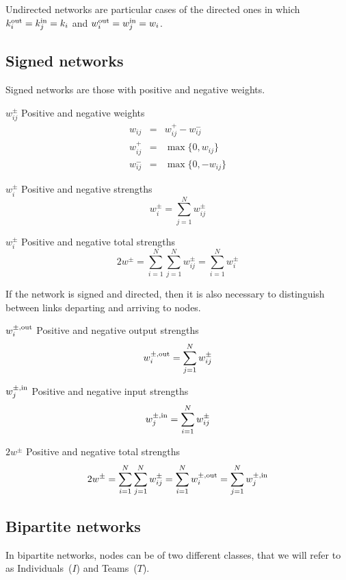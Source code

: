 \documentclass[11pt]{article}
\newcommand{\beq}{\begin{equation}}
\newcommand{\eeq}{\end{equation}}
\newcommand{\bea}{\begin{eqnarray}}
\newcommand{\eea}{\end{eqnarray}}
\newcommand{\sz}{\scriptsize}
\newcommand{\wout}[2]{{#1}_{#2}^{\mbox{\sz out}}}
\newcommand{\win}[2]{{#1}_{#2}^{\mbox{\sz in}}}
\newcommand{\wpos}[2]{{#1}_{#2}^{+}}
\newcommand{\wneg}[2]{{#1}_{#2}^{-}}
\newcommand{\wpm}[2]{{#1}_{#2}^{\pm}}
\newcommand{\wpmout}[2]{{#1}_{#2}^{\pm,\mbox{\sz out}}}
\newcommand{\wpmin}[2]{{#1}_{#2}^{\pm,\mbox{\sz in}}}
\newcommand{\bdesc}[2]{\begin{basedescript}{\desclabelstyle{\pushlabel}\desclabelwidth{#1}\setlength{\labelsep}{0mm}\setlength{\leftmargin}{#2}}}
\newcommand{\edesc}{\end{basedescript}}
\begin{document}
\noindent
Undirected networks are particular cases of the directed ones in which $\wout{k}{i}=\win{k}{j}=k_i$ and
$\wout{w}{i}=\win{w}{j}=w_i$.


\subsection{Signed networks}

Signed networks are those with positive and negative weights.

\bdesc{12mm}{12mm}
\item[$\wpm{w}{ij}$] Positive and negative weights
  \bea
    w_{ij}       & = & \wpos{w}{ij} - \wneg{w}{ij} \\
    \wpos{w}{ij} & = & \max\{0,  w_{ij}\}  \\
    \wneg{w}{ij} & = & \max\{0, -w_{ij}\}
  \eea
\item[$\wpm{w}{i}$] Positive and negative strengths
  \beq
    \wpm{w}{i} = \sum_{j=1}^N \wpm{w}{ij}
  \eeq
\item[$\wpm{w}{i}$] Positive and negative total strengths
  \beq
    2 \wpm{w}{} = \sum_{i=1}^N \sum_{j=1}^N \wpm{w}{ij} = \sum_{i=1}^N \wpm{w}{i}
  \eeq
\edesc

\noindent
If the network is signed and directed, then it is also necessary to distinguish between
links departing and arriving to nodes.

\bdesc{12mm}{12mm}
\item[$\wpmout{w}{i}$] Positive and negative output strengths
  \beq
    \wpmout{w}{i} = \sum_{j=1}^N \wpm{w}{ij}
  \eeq
\item[$\wpmin{w}{j}$] Positive and negative input strengths
  \beq
    \wpmin{w}{j} = \sum_{i=1}^N \wpm{w}{ij}
  \eeq
\item[$2 \wpm{w}{}$] Positive and negative total strengths
  \beq
    2 \wpm{w}{} = \sum_{i=1}^N \sum_{j=1}^N \wpm{w}{ij} = \sum_{i=1}^N \wpmout{w}{i} = \sum_{j=1}^N \wpmin{w}{j}
  \eeq
\edesc


\subsection{Bipartite networks}

In bipartite networks, nodes can be of two different classes, that we will refer to as Individuals~($I$) and Teams~($T$).
\end{document}
